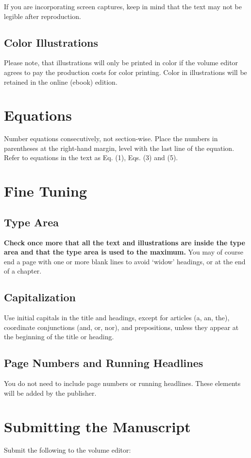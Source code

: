\documentclass{IOS-Book-Article}
\begin{document}
If you are incorporating screen captures, keep in mind that the text may not be
legible after reproduction.

\subsection{Color Illustrations}
Please note, that illustrations will only be printed in color if the volume editor agrees to
pay the production costs for color printing. Color in illustrations will be retained
in the online (ebook) edition.


\section{Equations}
Number equations consecutively, not section-wise. Place the numbers in parentheses at
the right-hand margin, level with the last line of the equation. Refer to equations in the
text as Eq. (1), Eqs. (3) and (5).

\section{Fine Tuning}

\subsection{Type Area}
\textbf{Check once more that all the text and illustrations are inside the type area and
that the type area is used to the maximum.} You may of course end a page with one
or more blank lines to avoid `widow' headings, or at the end of a chapter.

\subsection{Capitalization}
Use initial capitals in the title and headings, except for articles (a, an, the), coordinate
conjunctions (and, or, nor), and prepositions, unless they appear at the beginning of the
title or heading.

\subsection{Page Numbers and Running Headlines}
You do not need to include page numbers or running headlines. These elements will be
added by the publisher.

\section{Submitting the Manuscript}
Submit the following to the volume editor:
\end{document}
